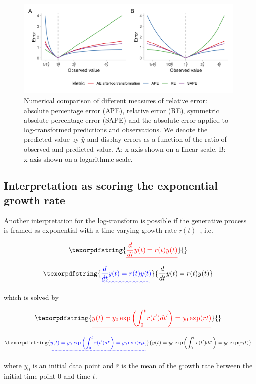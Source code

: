 \documentclass{article}
\providecommand{\DIFaddtex}[1]{{\protect\color{blue}\uwave{#1}}} %
\providecommand{\DIFdeltex}[1]{{\protect\color{red}\sout{#1}}}                      %
\providecommand{\DIFaddbegin}{} %
\providecommand{\DIFaddend}{} %
\providecommand{\DIFdelbegin}{} %
\providecommand{\DIFdelend}{} %
\providecommand{\DIFaddbeginFL}{} %
\providecommand{\DIFaddendFL}{} %
\providecommand{\DIFdelbeginFL}{} %
\providecommand{\DIFdelendFL}{} %
\providecommand{\DIFadd}[1]{\texorpdfstring{\DIFaddtex{#1}}{#1}} %
\providecommand{\DIFdel}[1]{\texorpdfstring{\DIFdeltex{#1}}{}} %
\newcommand{\DIFscaledelfig}{0.5}
\newlength{\DIFdelgraphicswidth} %
\newlength{\DIFdelgraphicsheight} %
\newcommand{\DIFaddincludegraphics}[2][]{{\color{blue}\fbox{\DIFOincludegraphics[#1]{#2}}}} %
\newcommand{\DIFdelincludegraphics}[2][]{%
\sbox{\DIFdelgraphicsbox}{\DIFOincludegraphics[#1]{#2}}%
\settoboxwidth{\DIFdelgraphicswidth}{\DIFdelgraphicsbox} %
\settoboxtotalheight{\DIFdelgraphicsheight}{\DIFdelgraphicsbox} %
\scalebox{\DIFscaledelfig}{%
\parbox[b]{\DIFdelgraphicswidth}{\usebox{\DIFdelgraphicsbox}\\[-\baselineskip] \rule{\DIFdelgraphicswidth}{0em}}\llap{\resizebox{\DIFdelgraphicswidth}{\DIFdelgraphicsheight}{%
\setlength{\unitlength}{\DIFdelgraphicswidth}%
\begin{picture}(1,1)%
\thicklines\linethickness{2pt} %
{\color[rgb]{1,0,0}\put(0,0){\framebox(1,1){}}}%
{\color[rgb]{1,0,0}\put(0,0){\line( 1,1){1}}}%
{\color[rgb]{1,0,0}\put(0,1){\line(1,-1){1}}}%
\end{picture}%
}\hspace*{3pt}}} %
} %
\DeclareRobustCommand{\DIFaddbegin}{\DIFOaddbegin \let\includegraphics\DIFaddincludegraphics} %
\DeclareRobustCommand{\DIFaddend}{\DIFOaddend \let\includegraphics\DIFOincludegraphics} %
\DeclareRobustCommand{\DIFdelbegin}{\DIFOdelbegin \let\includegraphics\DIFdelincludegraphics} %
\DeclareRobustCommand{\DIFdelend}{\DIFOaddend \let\includegraphics\DIFOincludegraphics} %
\DeclareRobustCommand{\DIFaddbeginFL}{\DIFOaddbeginFL \let\includegraphics\DIFaddincludegraphics} %
\DeclareRobustCommand{\DIFaddendFL}{\DIFOaddendFL \let\includegraphics\DIFOincludegraphics} %
\DeclareRobustCommand{\DIFdelbeginFL}{\DIFOdelbeginFL \let\includegraphics\DIFdelincludegraphics} %
\DeclareRobustCommand{\DIFdelendFL}{\DIFOaddendFL \let\includegraphics\DIFOincludegraphics} %
\begin{document}
\begin{figure}[h!]
\centering
\DIFdelbeginFL %
\DIFdelendFL \DIFaddbeginFL \includegraphics[width = 1\textwidth]{../output/figures/different-relative-errors.png}
\DIFaddendFL \caption{Numerical comparison of different measures of relative error: absolute percentage error (APE), relative error (RE), symmetric absolute percentage error (SAPE) and the absolute error applied to log-transformed predictions and observations. We denote the predicted value by $\hat{y}$ and display errors as a function of the ratio of observed and predicted value. A: x-axis shown on a linear scale. B: x-axis shown on a logarithmic scale.}
\label{fig:SAPE}
\end{figure}

\subsection{Interpretation as scoring the exponential growth rate}
\label{sec:methods:growthrate}

Another interpretation for the log-transform is possible if the generative process is framed as exponential with a time-varying growth rate $r(t)$~\citep[see, e.g.,][]{wallingaHowGenerationIntervals2007}, i.e.
\begin{linenomath*}
\DIFdelbegin \begin{displaymath}
\DIFdel{\frac{d}{dt}y(t) = r(t)y(t)
}\end{displaymath}%
\DIFdelend \DIFaddbegin \begin{equation}
\DIFadd{\frac{d}{dt}y(t) = r(t)y(t)
}\end{equation}\DIFaddend 
\end{linenomath*}
%
which is solved by
%
\begin{linenomath*}
\DIFdelbegin \begin{displaymath}
\DIFdel{y(t) = y_0 \exp \left( \int_0^t r(t') dt' \right) = y_0 \exp (\bar{r}t)
}\end{displaymath}%
\DIFdelend \DIFaddbegin \begin{equation}
\DIFadd{y(t) = y_0 \exp \left( \int_0^t r(t') dt' \right) = y_0 \exp (\bar{r_t}t)
}\end{equation}\DIFaddend 
\end{linenomath*}
where $y_0$ is an initial data point and \DIFdelbegin \DIFdel{$\bar{r}$ }\DIFdelend \DIFaddbegin \DIFadd{$\bar{r_t}$ }\DIFaddend is the mean of the growth rate between the initial time point $0$ and time $t$.
\end{document}
